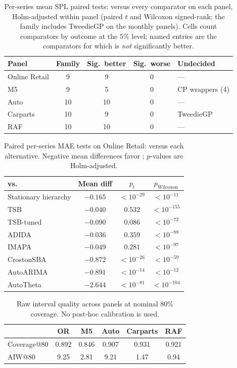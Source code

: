 \begin{table}[t]
\centering
\caption{Per-series mean SPL paired tests: \REMIX{} versus every
comparator on each panel, Holm-adjusted within panel (paired $t$ and
Wilcoxon signed-rank; the family includes TweedieGP on the monthly
panels). Cells count comparators by outcome at the $5\%$ level; named
entries are the comparators for which \REMIX{} is \emph{not}
significantly better.}
\label{tab:spl-significance}
\small
\setlength{\tabcolsep}{4.0pt}
\begin{tabular}{lcccl}
\toprule
Panel & Family & Sig.\ better & Sig.\ worse & Undecided\\
\midrule
Online Retail & 9 & 9 & 0 & ---\\
M5 & 9 & 5 & 0 & CP wrappers (4)\\
Auto & 10 & 10 & 0 & ---\\
Carparts & 10 & 9 & 0 & TweedieGP\\
RAF & 10 & 10 & 0 & ---\\
\bottomrule
\end{tabular}
\end{table}

\begin{table}[t]
\centering
\caption{Paired per-series MAE tests on Online Retail: \REMIX{} versus
each alternative. Negative mean differences favor \REMIX{}; $p$-values
are Holm-adjusted.}
\label{tab:significance}
\small
\setlength{\tabcolsep}{5pt}
\begin{tabular}{lccc}
\toprule
vs. & Mean diff & $p_t$ & $p_{\mathrm{Wilcoxon}}$\\
\midrule
Stationary hierarchy & $-0.165$ & $<10^{-29}$ & $<10^{-11}$\\
TSB & $-0.040$ & $0.532$ & $<10^{-155}$\\
TSB-tuned & $-0.090$ & $0.086$ & $<10^{-72}$\\
ADIDA & $-0.036$ & $0.359$ & $<10^{-88}$\\
IMAPA & $-0.049$ & $0.281$ & $<10^{-97}$\\
CrostonSBA & $-0.872$ & $<10^{-26}$ & $<10^{-59}$\\
AutoARIMA & $-0.891$ & $<10^{-14}$ & $<10^{-12}$\\
AutoTheta & $-2.644$ & $<10^{-81}$ & $<10^{-104}$\\
\bottomrule
\end{tabular}
\end{table}

\begin{table}[t]
\centering
\caption{Raw \REMIX{} interval quality across panels at nominal $80\%$
coverage. No post-hoc calibration is used.}
\label{tab:coverage}
\small
\setlength{\tabcolsep}{4.6pt}
\begin{tabular}{lccccc}
\toprule
 & OR & M5 & Auto & Carparts & RAF\\
\midrule
Coverage@80 & 0.892 & 0.846 & 0.907 & 0.931 & 0.921\\
AIW@80 & 9.25 & 2.81 & 9.21 & 1.47 & 0.94\\
\bottomrule
\end{tabular}
\end{table}

